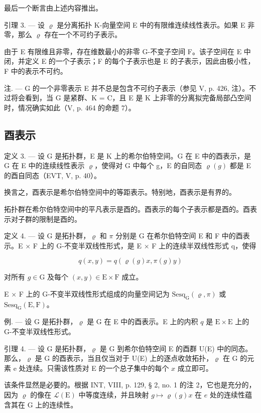 最后一个断言由上述内容推出。

引理 3. --- 设 \(\varrho\) 是分离拓扑 K-向量空间 E 中的有限维连续线性表示。如果 E 非零，那么 \(\varrho\) 存在一个不可约子表示。

由于 E 有限维且非零，存在维数最小的非零 G-不变子空间 F。该子空间在 E 中闭，并定义 E 的一个子表示；F 的每个子表示也是 E 的子表示，因此由极小性，F 中的表示不可约。

注. --- G 的一个非零表示 E 并不总是包含不可约子表示（参见 V, p. 426, 注）。不过将会看到，当 G 是紧群、K = C，且 E 是 K 上非零的分离拟完备局部凸空间时，情况确实如此（V, p. 464 的命题 7）。

\subsection{酉表示}

定义 3. --- 设 G 是拓扑群，E 是 K 上的希尔伯特空间。G 在 E 中的酉表示，是 G 在 E 中的连续线性表示 \(\varrho\)，使得对 G 中每个 g，E 的自同态 \(\varrho(g)\) 都是 E 的酉自同态（EVT, V, p. 40）。

换言之，酉表示是希尔伯特空间中的等距表示。特别地，酉表示是有界的。

拓扑群在希尔伯特空间中的平凡表示是酉的。酉表示的每个子表示都是酉的。酉表示对子群的限制是酉的。

定义 4. --- 设 G 是拓扑群，\(\varrho\) 和 \(\pi\) 分别是 G 在希尔伯特空间 E 和 F 中的酉表示。E × F 上的 G-不变半双线性形式，是 E × F 上的连续半双线性形式 q，使得

\[
q (x, y) = q (\varrho (g) x, \pi (g) y)
\]

对所有 \(g \in \mathrm{G}\) 及每个 \((x, y) \in \mathrm{E} \times \mathrm{F}\) 成立。

E × F 上的 G-不变半双线性形式组成的向量空间记为 \(\mathrm{Sesq}_{\mathrm{G}}(\varrho,\pi)\) 或 \(\mathrm{Sesq}_{\mathrm{G}}(\mathrm{E},\mathrm{F})\)。

例. --- 设 G 是拓扑群，\(\varrho\) 是 G 在 E 中的酉表示。E 上的内积 \(q\) 是 \(\mathrm{E} \times \mathrm{E}\) 上的 G-不变半双线性形式。

引理 4. --- 设 G 是拓扑群，\(\varrho\) 是 G 到希尔伯特空间 E 的酉群 U(E) 中的同态。那么，\(\varrho\) 是 G 的酉表示，当且仅当对于 U(E) 上的逐点收敛拓扑，\(\varrho\) 在 G 的元素 e 处连续。只需该性质对 E 的一个总子集中的每个 \(x\) 成立即可。

该条件显然是必要的。根据 INT, VIII, p. 129, § 2, no. 1 的注 2，它也是充分的，因为 \(\varrho\) 的像在 \(\mathcal{L}(\mathrm{E})\) 中等度连续，并且映射 \(g \mapsto \varrho(g)x\) 在 \(e\) 处的连续性蕴含其在 G 上的连续性。

